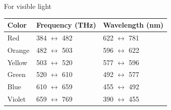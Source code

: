 \documentclass[../../../main.tex]{subfiles}
\begin{document}
For visible light
\begin{center}
        \begin{longtable}{| p{} | p{} | p{} |}
            \hline
            Color&Frequency (THz)&Wavelength (nm)\\\hline\hline
            Red&384 $\leftrightarrow$ 482&622 $\leftrightarrow$ 781\\
        Orange&482 $\leftrightarrow$ 503&596 $\leftrightarrow$ 622\\
        Yellow&503 $\leftrightarrow$ 520&577 $\leftrightarrow$ 596\\
        Green&520 $\leftrightarrow$ 610&492 $\leftrightarrow$ 577\\
        Blue&610 $\leftrightarrow$ 659&455 $\leftrightarrow$ 492\\
        Violet&659 $\leftrightarrow$ 769&390 $\leftrightarrow$ 455\\\hline
        \end{longtable}    
\end{center}%
\end{document}
